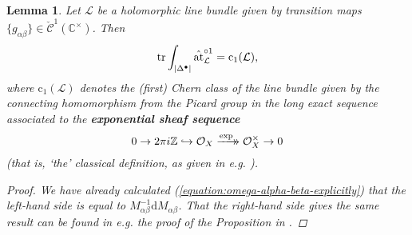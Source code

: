 \documentclass[11pt,fleqn]{article}
\theoremstyle{plain}
\newtheorem{lemma}[theorem]{Lemma}
\theoremstyle{definition}
\theoremstyle{remark}
\numberwithin{equation}{theorem}
\newcommand{\OO}{\mathcal{O}}
\newcommand{\at}{\mathrm{at}}
\newcommand{\simpexpat}[1]{\hat{\at}^{\circ#1}}
\newcommand{\define}[1]{\textbf{#1}}
\newcommand{\xtwoheadrightarrow}[2][]{%
  \xrightarrow[#1]{#2}\mathrel{\mkern-14mu}\rightarrow
}
\renewcommand{\d}{\mathrm{d}}
\begin{document}
        \begin{lemma}\label{lemma:agrees-for-line-bundles}
            Let $\mathcal{L}$ be a holomorphic line bundle given by transition maps $\{g_{\alpha\beta}\}\in\check{\mathcal{C}}^1(\mathbb{C}^\times)$.
            Then
            \begin{equation*}
                \tr\int_{|\Delta^\bullet|}\simpexpat{1}_\mathcal{L} = \mathrm{c}_1(\mathcal{L}),
            \end{equation*}
            where $\mathrm{c}_1(\mathcal{L})$ denotes the (first) Chern class of the line bundle given by the connecting homomorphism from the Picard group in the long exact sequence associated to the \define{exponential sheaf sequence}
            \begin{equation*}
                0
                \to
                2\pi i\mathbb{Z}
                \hookrightarrow
                \OO_X
                \xtwoheadrightarrow{\exp}
                \OO_X^\times
                \to
                0
            \end{equation*}
            (that is, `the' classical definition, as given in e.g. \cite[Definition~2.2.13]{Huybrechts2005}).
            \begin{proof}
                We have already calculated (\cref{equation:omega-alpha-beta-explicitly}) that the left-hand side is equal to $M_{\alpha\beta}^{-1}\d M_{\alpha\beta}$.
                That the right-hand side gives the same result can be found in e.g. the proof of the Proposition in \cite[Chapter~1, §1, \emph{Chern Classes of Line Bundles}, p.~141]{Griffiths&Harris1994}.
            \end{proof}
        \end{lemma}
\end{document}

